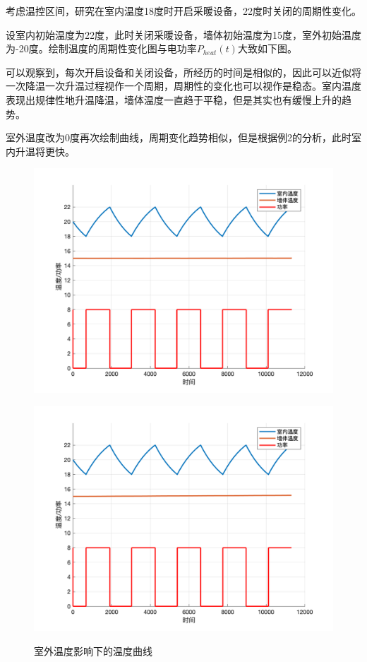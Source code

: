 \documentclass[withoutpreface,bwprint]{cumcmthesis} %
\begin{document}
\begin{example}
    \label{exa:example}
考虑温控区间，研究在室内温度18度时开启采暖设备，22度时关闭的周期性变化。
\end{example}
设室内初始温度为22度，此时关闭采暖设备，墙体初始温度为15度，室外初始温度为-20度。绘制温度的周期性变化图与电功率$P_{heat}(t)$大致如下图。

可以观察到，每次开启设备和关闭设备，所经历的时间是相似的，因此可以近似将一次降温一次升温过程视作一个周期，周期性的变化也可以视作是稳态。室内温度表现出规律性地升温降温，墙体温度一直趋于平稳，但是其实也有缓慢上升的趋势。

室外温度改为0度再次绘制曲线，周期变化趋势相似，但是根据例2的分析，此时室内升温将更快。
\begin{figure}[h]
    \centering
    \begin{minipage}[c]{0.45\textwidth}
        \includegraphics[width=1\textwidth]{figures/1-1-2.png}
    \label{fig:my_label}
    \end{minipage}
\begin{minipage}[c]{0.45\textwidth}
    \includegraphics[width=1\textwidth]{figures/1-1-3.png}
    \label{fig:my_label}
\end{minipage}
\caption{室外温度影响下的温度曲线}
\end{figure}
\end{document}
